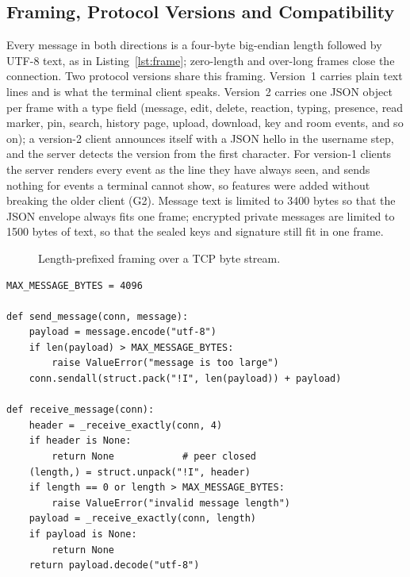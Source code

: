 \documentclass[conference]{IEEEtran}
\begin{document}
\subsection{Framing, Protocol Versions and Compatibility}\label{sec:framing}
Every message in both directions is a four-byte big-endian length followed by UTF-8 text, as in Listing~\ref{lst:frame}; zero-length and over-long frames close the connection. Two protocol versions share this framing. Version~1 carries plain text lines and is what the terminal client speaks. Version~2 carries one JSON object per frame with a type field (message, edit, delete, reaction, typing, presence, read marker, pin, search, history page, upload, download, key and room events, and so on); a version-2 client announces itself with a JSON hello in the username step, and the server detects the version from the first character. For version-1 clients the server renders every event as the line they have always seen, and sends nothing for events a terminal cannot show, so features were added without breaking the older client (G2). Message text is limited to 3400 bytes so that the JSON envelope always fits one frame; encrypted private messages are limited to 1500 bytes of text, so that the sealed keys and signature still fit in one frame.

\begin{figure}[t]
\centering
{}
\caption{Length-prefixed framing over a TCP byte stream.}
\label{fig:framing}
\end{figure}
\begin{lstlisting}[caption={Framing logic of the reference implementation (\texttt{protocol.py}, condensed).},label={lst:frame},float=t]
MAX_MESSAGE_BYTES = 4096

def send_message(conn, message):
    payload = message.encode("utf-8")
    if len(payload) > MAX_MESSAGE_BYTES:
        raise ValueError("message is too large")
    conn.sendall(struct.pack("!I", len(payload)) + payload)

def receive_message(conn):
    header = _receive_exactly(conn, 4)
    if header is None:
        return None            # peer closed
    (length,) = struct.unpack("!I", header)
    if length == 0 or length > MAX_MESSAGE_BYTES:
        raise ValueError("invalid message length")
    payload = _receive_exactly(conn, length)
    if payload is None:
        return None
    return payload.decode("utf-8")
\end{lstlisting}
\end{document}
